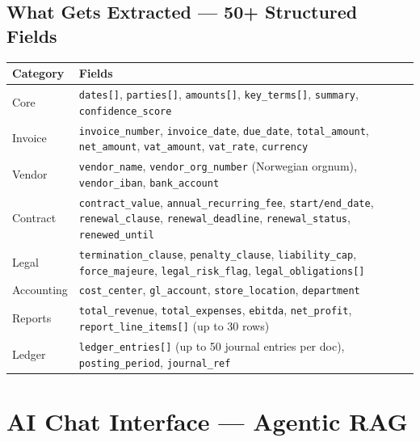 \documentclass[12pt,a4paper]{article}
\newcommand{\codeinline}[1]{\texttt{\small\color{NordicBlue}#1}}
\begin{document}
\subsection{What Gets Extracted — 50+ Structured Fields}

\begin{tabularx}{\textwidth}{lX}
\toprule
\textbf{Category} & \textbf{Fields} \\
\midrule
Core & \codeinline{dates[]}, \codeinline{parties[]}, \codeinline{amounts[]}, \codeinline{key\_terms[]}, \codeinline{summary}, \codeinline{confidence\_score} \\
Invoice & \codeinline{invoice\_number}, \codeinline{invoice\_date}, \codeinline{due\_date}, \codeinline{total\_amount}, \codeinline{net\_amount}, \codeinline{vat\_amount}, \codeinline{vat\_rate}, \codeinline{currency} \\
Vendor & \codeinline{vendor\_name}, \codeinline{vendor\_org\_number} (Norwegian orgnum), \codeinline{vendor\_iban}, \codeinline{bank\_account} \\
Contract & \codeinline{contract\_value}, \codeinline{annual\_recurring\_fee}, \codeinline{start/end\_date}, \codeinline{renewal\_clause}, \codeinline{renewal\_deadline}, \codeinline{renewal\_status}, \codeinline{renewed\_until} \\
Legal & \codeinline{termination\_clause}, \codeinline{penalty\_clause}, \codeinline{liability\_cap}, \codeinline{force\_majeure}, \codeinline{legal\_risk\_flag}, \codeinline{legal\_obligations[]} \\
Accounting & \codeinline{cost\_center}, \codeinline{gl\_account}, \codeinline{store\_location}, \codeinline{department} \\
Reports & \codeinline{total\_revenue}, \codeinline{total\_expenses}, \codeinline{ebitda}, \codeinline{net\_profit}, \codeinline{report\_line\_items[]} (up to 30 rows) \\
Ledger & \codeinline{ledger\_entries[]} (up to 50 journal entries per doc), \codeinline{posting\_period}, \codeinline{journal\_ref} \\
\bottomrule
\end{tabularx}

\newpage

\section{AI Chat Interface — Agentic RAG}
\end{document}
